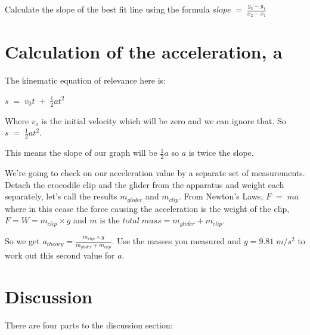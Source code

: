 \documentclass[
  letterpaper,
  DIV=11,
  numbers=noendperiod]{scrreprt}
\begin{document}
Calculate the slope of the best fit line using the formula
\(slope \; = \; \frac{y_2-y_1}{x_2-x_1}\)

\section{Calculation of the acceleration,
a}\label{calculation-of-the-acceleration-a}

The kinematic equation of relevance here is:

\(s \; = \; v_0 t \; + \; \frac{1}{2} a t^2\)

Where \(v_o\) is the initial velocity which will be zero and we can
ignore that. So \(s \; = \; \frac{1}{2} a t^2\).

This means the slope of our graph will be \(\frac{1}{2}a\) so \(a\) is
twice the slope.

We're going to check on our acceleration value by a separate set of
measurements. Detach the crocodile clip and the glider from the
apparatus and weight each separately, let's call the results
\(m_{glider}\) and \(m_{clip}\). From Newton's Laws, \(F \; = \; ma\)
where in this ccase the force causing the acceleration is the weight of
the clip, \(F = W = m_{clip} \times g\) and \(m\) is the
\(total \; mass = m_{glider} + m_{clip}\).

So we get
\(a_{theory} = \frac{m_{clip} \times g}{m_{glider} + m_{clip}}\). Use
the masses you measured and \(g = 9.81 \; m/s^2\) to work out this
second value for \(a\).

\section{Discussion}\label{discussion-4}

There are four parts to the discussion section:
\end{document}
